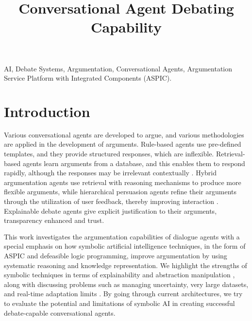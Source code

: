 \documentclass[conference]{IEEEtran}
\begin{document}
\title{Conversational Agent Debating Capability}

\author{
\and
{}
}

\maketitle

\begin{abstract}

\end{abstract}

\begin{IEEEkeywords}
AI, Debate Systems, Argumentation, Conversational Agents, Argumentation Service Platform with Integrated Components (ASPIC).
\end{IEEEkeywords}

\section{Introduction}
Various conversational agents are developed to argue, and various methodologies are applied in the development of arguments. Rule-based agents use pre-defined templates, and they provide structured responses, which are inflexible. Retrieval-based agents learn arguments from a database, and this enables them to respond rapidly, although the responses may be irrelevant contextually \cite{b3}. Hybrid argumentation agents use retrieval with reasoning mechanisms to produce more flexible arguments, while hierarchical persuasion agents refine their arguments through the utilization of user feedback, thereby improving interaction \cite{b5}. Explainable debate agents give explicit justification to their arguments, transparency enhanced and trust.

This work investigates the argumentation capabilities of dialogue agents with a special emphasis on how symbolic artificial intelligence techniques, in the form of ASPIC and defeasible logic programming, improve argumentation by using systematic reasoning and knowledge representation. We highlight the strengths of symbolic techniques in terms of explainability and abstraction manipulation \cite{b11}, along with discussing problems such as managing uncertainty, very large datasets, and real-time adaptation limits \cite{b11}. By going through current architectures, we try to evaluate the potential and limitations of symbolic AI in creating successful debate-capable conversational agents.
\end{document}
